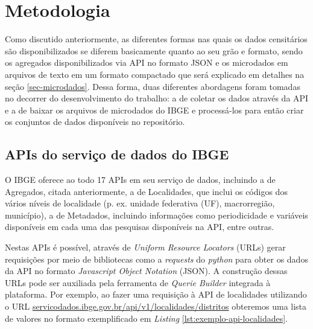 \chapter{Metodologia}

    

    Como discutido anteriormente, as diferentes formas nas quais os dados censitários são disponibilizados se diferem basicamente quanto ao seu grão e formato, sendo os agregados disponibilizados via API no formato JSON e os microdados em arquivos de texto em um formato compactado que será explicado em detalhes na seção \ref{sec-microdados}. Dessa forma, duas diferentes abordagens foram tomadas no decorrer do desenvolvimento do trabalho: a de coletar os dados através da API e a de baixar os arquivos de microdados do IBGE e processá-los para então criar os conjuntos de dados disponíveis no repositório.
    

\section{APIs do serviço de dados do IBGE}
\label{metodoslogia-API}

    O IBGE oferece ao todo 17 APIs em seu serviço de dados, incluindo a de Agregados, citada anteriormente, a de Localidades, que inclui os códigos dos vários níveis de localidade (p. ex. unidade federativa (UF), macrorregião, município), a de Metadados, incluindo informações como periodicidade e variáveis disponíveis em cada uma das pesquisas disponíveis na API, entre outras. 
    
    Nestas APIs é possível, através de \textit{Uniform Resource Locators} (URLs) gerar requisições por meio de bibliotecas como a \textit{requests} do \textit{python} para obter os dados da API no formato \textit{Javascript Object Notation} (JSON). A construção dessas URLs pode ser auxiliada pela ferramenta de \textit{Querie Builder} integrada à plataforma. Por exemplo, ao fazer uma requisição à API de localidades utilizando o URL \url{servicodados.ibge.gov.br/api/v1/localidades/distritos} obteremos uma lista de valores no formato exemplificado em \textit{Listing} \ref{lst:exemplo-api-localidades}.

